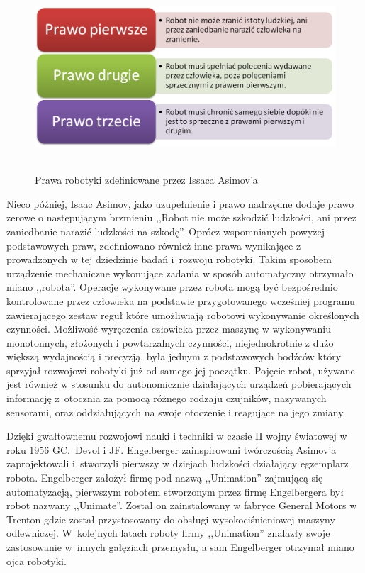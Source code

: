 \begin{figure}[h!]
\centering
\includegraphics[height=70mm]{../images/ch01/asimov_laws.png}
	\caption{Prawa robotyki zdefiniowane przez Issaca Asimov'a}
	\label{fig:Asimov_Laws}
\end{figure}

Nieco później, Isaac Asimov, jako uzupełnienie i prawo nadrzędne dodaje prawo
zerowe o następującym brzmieniu ,,Robot nie może szkodzić ludzkości, ani przez
zaniedbanie narazić ludzkości na szkodę''\cite{website:robotyka-pl}. Oprócz
wspomnianych powyżej podstawowych praw, zdefiniowano również inne prawa
wynikające z prowadzonych w tej dziedzinie badań i~rozwoju robotyki. \newpage
Takim sposobem urządzenie mechaniczne wykonujące zadania w sposób automatyczny
otrzymało miano ,,robota''\cite{website:asimo-pl}. Operacje wykonywane przez
robota mogą być bezpośrednio kontrolowane przez człowieka na podstawie
przygotowanego wcześniej programu zawierającego zestaw reguł które umożliwiają
robotowi wykonywanie określonych czynności. Możliwość wyręczenia człowieka przez
maszynę w wykonywaniu monotonnych, złożonych i powtarzalnych czynności,
niejednokrotnie z dużo większą wydajnością i precyzją, była jednym z podstawowych
bodźców który sprzyjał rozwojowi robotyki już od samego jej początku. Pojęcie
robot, używane jest również w stosunku do autonomicznie działających urządzeń
pobierających informację z~otocznia za pomocą różnego rodzaju czujników,
nazywanych sensorami, oraz oddziałujących na swoje otoczenie i reagujące na jego
zmiany.

Dzięki gwałtownemu rozwojowi nauki i techniki w czasie II wojny światowej w roku
1956 GC.~Devol i JF. Engelberger zainspirowani twórczością Asimov'a
zaprojektowali i~stworzyli pierwszy w dziejach ludzkości działający egzemplarz
robota\cite{website:robotyka-pl}. Engelberger założył firmę pod nazwą
,,Unimation'' zajmującą się automatyzacją, pierwszym robotem stworzonym przez
firmę Engelbergera był robot nazwany ,,Unimate''. Został on zainstalowany w
fabryce General Motors w Trenton gdzie został przystosowany do obsługi
wysokociśnieniowej maszyny odlewniczej. W~kolejnych latach roboty firmy
,,Unimation'' znalazły swoje zastosowanie w~innych gałęziach przemysłu, a sam
Engelberger otrzymał miano ojca robotyki.\cite{website:robotyka-pl}
 

